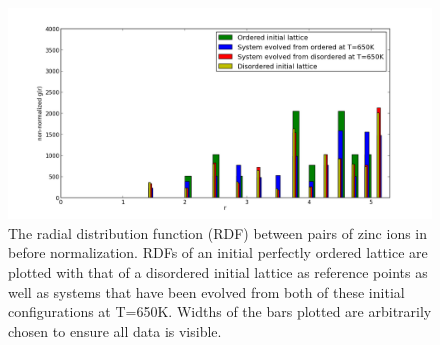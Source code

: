 \begin{figure}[h!]
  \centering
    \includegraphics[width=1.0\textwidth]{figures/RDF_Z-Z_equil_check.png}
    \caption{The radial distribution function (RDF) between pairs of zinc ions in {\CZTS} before normalization. RDFs of an initial perfectly ordered lattice are plotted with that of a disordered initial lattice as reference points as well as systems that have been evolved from both of these initial configurations at T=650K. Widths of the bars plotted are arbitrarily chosen to ensure all data is visible.}
  \label{RDF_Z-Z_equil_check}
\end{figure}




